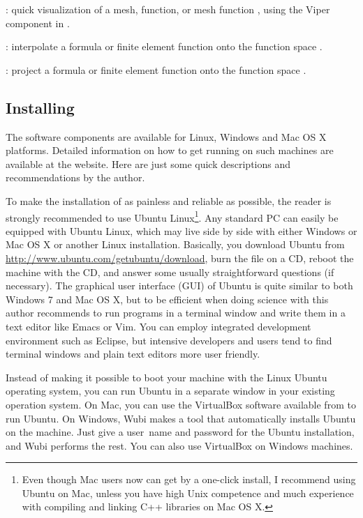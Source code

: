 \begin{trivlist}
  \item[\emp{plot(q)}:] quick visualization of a mesh, function, or mesh
  function , using the Viper component in \fenics{}.

  \item[\emp{interpolate(func, V)}:] interpolate a formula or finite
  element function  onto the function space .

  \item[\emp{project(func, V)}:] project a formula or finite element
  function  onto the function space .
\end{trivlist}

\subsection{Installing \fenics}
\label{langtangen:app:install}
\label{installing FEniCS}

The \fenics{} software components are available for Linux, Windows and
Mac OS X platforms. Detailed information on how to get \fenics{} running
on such machines are available at the  website.
Here are just some quick descriptions and recommendations by the author.

To make the installation of \fenics{} as painless and reliable
as possible, the reader is strongly recommended to use Ubuntu
Linux\footnote{Even though Mac users now can get \fenics{} by a
  one-click install, I recommend using Ubuntu on Mac, unless you have
  high Unix competence and much experience with compiling and linking C++
  libraries on Mac OS X.}. Any standard PC can easily be equipped
with Ubuntu Linux, which may live side by side with either Windows
or Mac OS X or another Linux installation.  Basically, you download
Ubuntu from \url{http://www.ubuntu.com/getubuntu/download}, burn the
file on a CD, reboot the machine with the CD, and answer some usually
straightforward questions (if necessary). The graphical user interface
(GUI) of Ubuntu is quite similar to both Windows 7 and Mac OS X, but to
be efficient when doing science with \fenics{} this author recommends
to run programs in a terminal window and write them in a text editor
like Emacs or Vim. You can employ integrated development environment
such as Eclipse, but intensive \fenics{} developers and users tend to
find terminal windows and plain text editors more user friendly.

Instead of making it possible to boot your machine with the Linux
Ubuntu operating system, you can run Ubuntu in a separate window in
your existing operation system. On Mac, you can use the VirtualBox
software available from  to run
Ubuntu. On Windows, Wubi makes a tool that automatically installs
Ubuntu on the machine. Just give a user~name and password for the
Ubuntu installation, and Wubi performs the rest. You can also use
VirtualBox on Windows machines.

